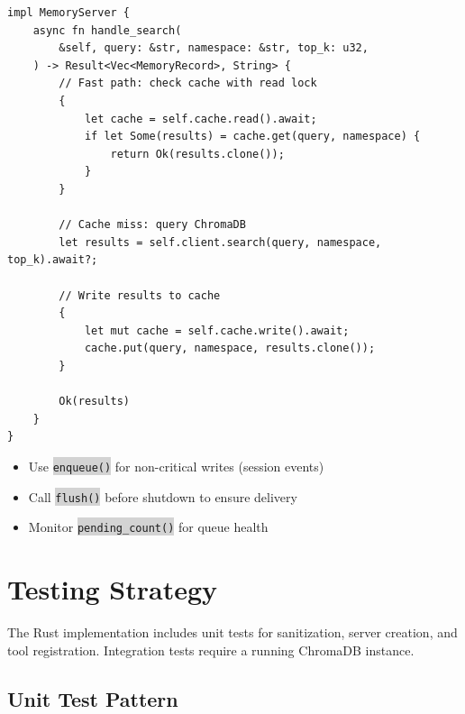 \documentclass[11pt,letterpaper]{article}
\newcommand{\code}[1]{\texttt{\small\colorbox{lightgray}{#1}}}
\begin{document}
\begin{lstlisting}[caption={Cache flow in search\_memories (Rust)}]
impl MemoryServer {
    async fn handle_search(
        &self, query: &str, namespace: &str, top_k: u32,
    ) -> Result<Vec<MemoryRecord>, String> {
        // Fast path: check cache with read lock
        {
            let cache = self.cache.read().await;
            if let Some(results) = cache.get(query, namespace) {
                return Ok(results.clone());
            }
        }

        // Cache miss: query ChromaDB
        let results = self.client.search(query, namespace, top_k).await?;

        // Write results to cache
        {
            let mut cache = self.cache.write().await;
            cache.put(query, namespace, results.clone());
        }

        Ok(results)
    }
}
\end{lstlisting}

\begin{tipbox}
\begin{itemize}
  \item Use \code{enqueue()} for non-critical writes (session events)
  \item Call \code{flush()} before shutdown to ensure delivery
  \item Monitor \code{pending\_count()} for queue health
\end{itemize}
\end{tipbox}

\section{Testing Strategy}

\begin{keybox}
The Rust implementation includes unit tests for sanitization, server creation, and tool registration. Integration tests require a running ChromaDB instance.
\end{keybox}

\subsection{Unit Test Pattern}
\end{document}
